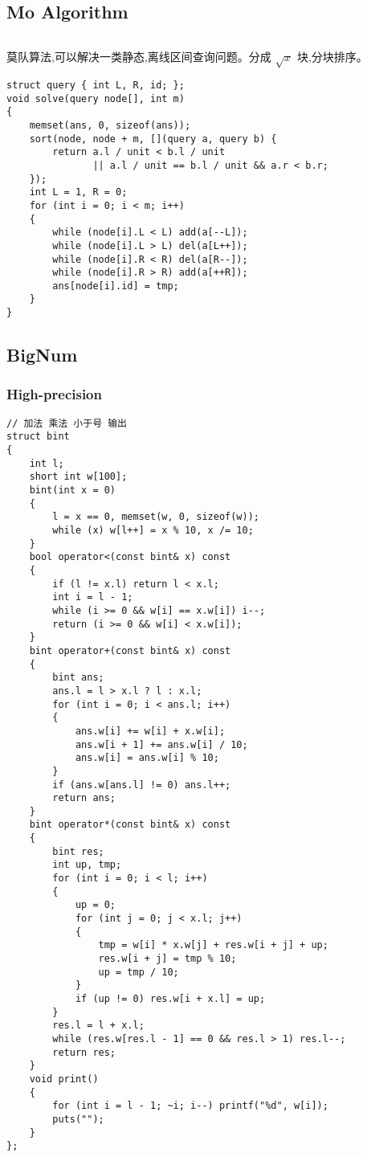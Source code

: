 \documentclass[twoside]{article}
\begin{document}
\subsection{Mo Algorithm}
\begin{lstlisting}
\end{lstlisting}
莫队算法,可以解决一类静态,离线区间查询问题。分成 $\sqrt{x}$ 块,分块排序。
\begin{lstlisting}
struct query { int L, R, id; };
void solve(query node[], int m)
{
    memset(ans, 0, sizeof(ans));
    sort(node, node + m, [](query a, query b) {
        return a.l / unit < b.l / unit
               || a.l / unit == b.l / unit && a.r < b.r;
    });
    int L = 1, R = 0;
    for (int i = 0; i < m; i++)
    {
        while (node[i].L < L) add(a[--L]);
        while (node[i].L > L) del(a[L++]);
        while (node[i].R < R) del(a[R--]);
        while (node[i].R > R) add(a[++R]);
        ans[node[i].id] = tmp;
    }
}
\end{lstlisting}
\subsection{BigNum}
\subsubsection{High-precision}
\begin{lstlisting}
// 加法 乘法 小于号 输出
struct bint
{
    int l;
    short int w[100];
    bint(int x = 0)
    {
        l = x == 0, memset(w, 0, sizeof(w));
        while (x) w[l++] = x % 10, x /= 10;
    }
    bool operator<(const bint& x) const
    {
        if (l != x.l) return l < x.l;
        int i = l - 1;
        while (i >= 0 && w[i] == x.w[i]) i--;
        return (i >= 0 && w[i] < x.w[i]);
    }
    bint operator+(const bint& x) const
    {
        bint ans;
        ans.l = l > x.l ? l : x.l;
        for (int i = 0; i < ans.l; i++)
        {
            ans.w[i] += w[i] + x.w[i];
            ans.w[i + 1] += ans.w[i] / 10;
            ans.w[i] = ans.w[i] % 10;
        }
        if (ans.w[ans.l] != 0) ans.l++;
        return ans;
    }
    bint operator*(const bint& x) const
    {
        bint res;
        int up, tmp;
        for (int i = 0; i < l; i++)
        {
            up = 0;
            for (int j = 0; j < x.l; j++)
            {
                tmp = w[i] * x.w[j] + res.w[i + j] + up;
                res.w[i + j] = tmp % 10;
                up = tmp / 10;
            }
            if (up != 0) res.w[i + x.l] = up;
        }
        res.l = l + x.l;
        while (res.w[res.l - 1] == 0 && res.l > 1) res.l--;
        return res;
    }
    void print()
    {
        for (int i = l - 1; ~i; i--) printf("%d", w[i]);
        puts("");
    }
};
\end{lstlisting}
\end{document}
